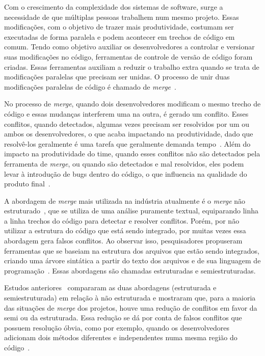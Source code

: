 
Com o crescimento da complexidade dos sistemas de software, surge a necessidade
de que múltiplas pessoas trabalhem num mesmo projeto. Essas modificações, com o
objetivo de trazer mais produtividade, costumam ser executadas de forma paralela e podem acontecer em
trechos de código em comum. Tendo como objetivo auxiliar os desenvolvedores a
controlar e versionar suas modificações no código, ferramentas de controle de versão de
código foram criadas. Essas ferramentas auxiliam a reduzir o trabalho extra quando se trata de
modificações paralelas que precisam ser unidas. O processo de unir duas modificações
paralelas de código é chamado de \emph{merge}~\cite{mens02}.

No processo de \emph{merge}, quando dois desenvolvedores modificam o mesmo trecho de
código e essas mudanças interferem uma na outra, é gerado um conflito. Esses conflitos,
quando detectados, algumas vezes precisam ser resolvidos por um ou ambos os desenvolvedores, o
que acaba impactando na produtividade, dado que resolvê-los geralmente é uma tarefa que geralmente demanda tempo~\cite{brun11}.
Além do impacto na produtividade do time, quando esses conflitos
não são detectados pela ferramenta de \emph{merge}, ou quando são detectados e mal resolvidos, eles
podem levar à introdução de bugs dentro do código, o que influencia na qualidade do produto final~\cite{brin20}.

A abordagem de \emph{merge} mais utilizada na indústria atualmente é o \emph{merge} não estruturado~\cite{khan07},
que se utiliza de uma análise puramente textual, equiparando linha a linha trechos do código
para detectar e resolver conflitos. Porém, por não utilizar a estrutura do código que está sendo
integrado, por muitas vezes essa abordagem gera falsos conflitos. Ao observar isso, pesquisadores
propuseram ferramentas que se baseiam na estrutura dos arquivos que estão sendo integrados, criando
uma árvore sintática a partir do texto dos arquivos e de sua linguagem de programação~\cite{apel11}.
Essas abordagens são chamadas estruturadas e semiestruturadas.

Estudos anteriores~\cite{apel11,cavalcanti15,cavalcanti19} compararam as duas abordagens (estruturada e semiestruturada)
em relação à não estruturada e mostraram que, para a maioria das situações de \emph{merge} dos projetos,
houve uma redução de conflitos em favor da semi ou da estruturada. Essa redução se dá por conta
de falsos conflitos que possuem resolução óbvia, como por exemplo, quando os desenvolvedores adicionam
dois métodos diferentes e independentes numa mesma região do código~\cite{cavalcanti17}.


